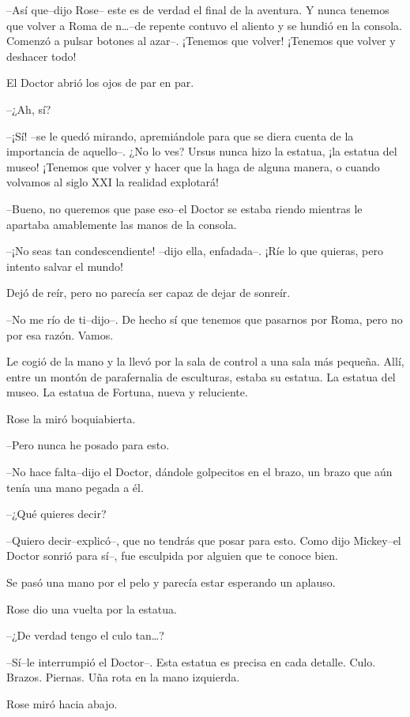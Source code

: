 --Así que--dijo Rose-- este es de verdad el final de la aventura. Y
nunca tenemos que volver a Roma de n\ldots{}--de repente contuvo el
aliento y se hundió en la consola. Comenzó a pulsar botones al azar--.
¡Tenemos que volver! ¡Tenemos que volver y deshacer todo!

El Doctor abrió los ojos de par en par.

--¿Ah, sí?

--¡Sí! --se le quedó mirando, apremiándole para que se diera cuenta de
la importancia de aquello--. ¿No lo ves? Ursus nunca hizo la estatua,
¡la estatua del museo! ¡Tenemos que volver y hacer que la haga de alguna
manera, o cuando volvamos al siglo XXI la realidad explotará!

--Bueno, no queremos que pase eso--el Doctor se estaba riendo mientras
le apartaba amablemente las manos de la consola.

--¡No seas tan condescendiente! --dijo ella, enfadada--. ¡Ríe lo que
quieras, pero intento salvar el mundo!

Dejó de reír, pero no parecía ser capaz de dejar de sonreír.

--No me río de ti--dijo--. De hecho sí que tenemos que pasarnos por
Roma, pero no por esa razón. Vamos.

Le cogió de la mano y la llevó por la sala de control a una sala más
pequeña. Allí, entre un montón de parafernalia de esculturas, estaba su
estatua. La estatua del museo. La estatua de Fortuna, nueva y
reluciente.

Rose la miró boquiabierta.

--Pero nunca he posado para esto.

--No hace falta--dijo el Doctor, dándole golpecitos en el brazo, un
brazo que aún tenía una mano pegada a él.

--¿Qué quieres decir?

--Quiero decir--explicó--, que no tendrás que posar para esto. Como dijo
Mickey--el Doctor sonrió para sí--, fue esculpida por alguien que te
conoce bien.

Se pasó una mano por el pelo y parecía estar esperando un aplauso.

Rose dio una vuelta por la estatua.

--¿De verdad tengo el culo tan\ldots{}?

--Sí--le interrumpió el Doctor--. Esta estatua es precisa en cada
detalle. Culo. Brazos. Piernas. Uña rota en la mano izquierda.

Rose miró hacia abajo.

